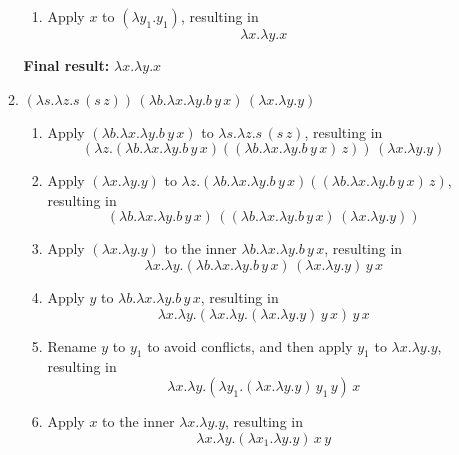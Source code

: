 \documentclass{article}
\begin{document}
\begin{enumerate}
\begin{enumerate}
\begin{enumerate}
            \item Apply \( x \) to \( (\lambda y_1.y_1) \), resulting in \\
\[
\lambda x.\lambda y.x
\]

        \end{enumerate}
        
        \textbf{Final result: } \( \lambda x.\lambda y.x \)
        
        \item $(\lambda s.\lambda z.s \, (s \, z)) \, (\lambda b.\lambda x.\lambda y.b \, y \, x) \, (\lambda x.\lambda y.y)$

        \begin{enumerate}
            \item Apply \( (\lambda b.\lambda x.\lambda y.b \, y \, x) \) to \( \lambda s.\lambda z.s \, (s \, z) \), resulting in \\
\[
(\lambda z.(\lambda b.\lambda x.\lambda y.b \, y \, x)((\lambda b.\lambda x.\lambda y.b \, y \, x) \, z)) \, (\lambda x.\lambda y.y)
\]
            \item Apply \( (\lambda x.\lambda y.y) \) to \( \lambda z.(\lambda b.\lambda x.\lambda y.b \, y \, x)((\lambda b.\lambda x.\lambda y.b \, y \, x) \, z) \), resulting in \\
\[
(\lambda b.\lambda x.\lambda y.b \, y \, x) \, ((\lambda b.\lambda x.\lambda y.b \, y \, x) \, (\lambda x.\lambda y.y))
\]

            \item Apply \( (\lambda x.\lambda y.y) \) to the inner \( \lambda b.\lambda x.\lambda y.b \, y \, x \), resulting in \\
\[
\lambda x.\lambda y.(\lambda b.\lambda x.\lambda y.b \, y \, x) \, (\lambda x.\lambda y.y) \, y \, x
\]

            \item Apply \( y \) to \( \lambda b.\lambda x.\lambda y.b \, y \, x \), resulting in \\
\[
\lambda x.\lambda y.(\lambda x.\lambda y.(\lambda x.\lambda y.y) \, y \, x) \, y \, x
\]

            \item Rename \( y \) to \( y_1 \) to avoid conflicts, and then apply \( y_1 \) to \( \lambda x.\lambda y.y \), resulting in \\
\[
\lambda x.\lambda y.(\lambda y_1.(\lambda x.\lambda y.y) \, y_1 \, y) \, x
\]

            
            \item Apply \( x \) to the inner \( \lambda x.\lambda y.y \), resulting in \\
\[
\lambda x.\lambda y.(\lambda x_1.\lambda y.y) \, x \, y
\]


\end{enumerate}
\end{enumerate}
\end{enumerate}
\end{document}
